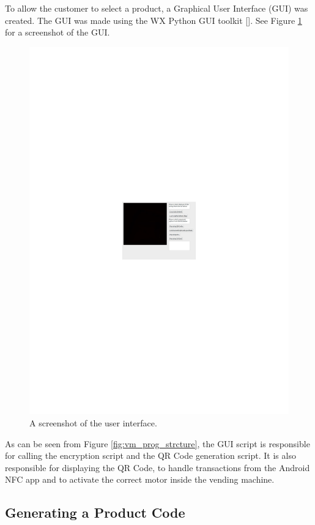 To allow the customer to select a product, a Graphical User Interface (GUI) was
created. The GUI was made using the WX Python GUI toolkit
[\cite{website:wx-python}].
See Figure \ref{fig:gui-screenshot} for a screenshot of the
GUI.

\begin{figure}
 \centering 
 \includegraphics[scale=0.4]{gui_screenshot}
 \caption{A screenshot of the user interface.}
 \label{fig:gui-screenshot}
\end{figure}

As can be seen from Figure \ref{fig:vm_prog_strcture}, the GUI script is
responsible for calling the encryption script and the QR Code generation script.
It is also responsible for displaying the QR Code, to handle transactions from
the Android NFC app and to activate the correct motor inside the vending
machine. 

\subsection{Generating a Product Code}

